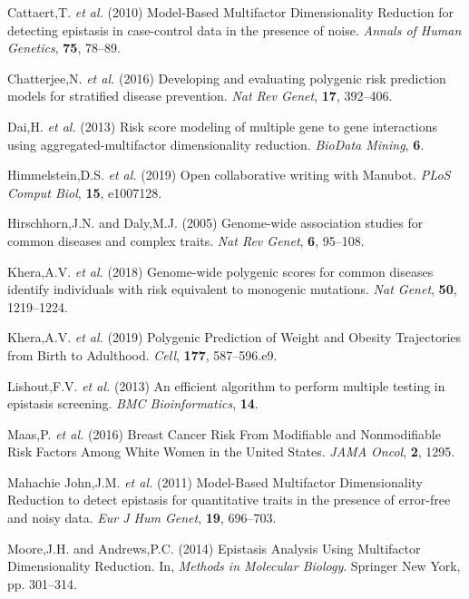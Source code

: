 \documentclass{ws-procs11x85}
\begin{document}
\leavevmode\hypertarget{ref-16AnEAMje}{}%
Cattaert,T. \emph{et al.} (2010) Model-Based Multifactor Dimensionality
Reduction for detecting epistasis in case-control data in the presence
of noise. \emph{Annals of Human Genetics}, \textbf{75}, 78--89.

\leavevmode\hypertarget{ref-auyRflEe}{}%
Chatterjee,N. \emph{et al.} (2016) Developing and evaluating polygenic
risk prediction models for stratified disease prevention. \emph{Nat Rev
Genet}, \textbf{17}, 392--406.

\leavevmode\hypertarget{ref-93PfLXPZ}{}%
Dai,H. \emph{et al.} (2013) Risk score modeling of multiple gene to gene
interactions using aggregated-multifactor dimensionality reduction.
\emph{BioData Mining}, \textbf{6}.

\leavevmode\hypertarget{ref-YuJbg3zO}{}%
Himmelstein,D.S. \emph{et al.} (2019) Open collaborative writing with
Manubot. \emph{PLoS Comput Biol}, \textbf{15}, e1007128.

\leavevmode\hypertarget{ref-5cdeEdUS}{}%
Hirschhorn,J.N. and Daly,M.J. (2005) Genome-wide association studies for
common diseases and complex traits. \emph{Nat Rev Genet}, \textbf{6},
95--108.

\leavevmode\hypertarget{ref-Gh0gKn77}{}%
Khera,A.V. \emph{et al.} (2018) Genome-wide polygenic scores for common
diseases identify individuals with risk equivalent to monogenic
mutations. \emph{Nat Genet}, \textbf{50}, 1219--1224.

\leavevmode\hypertarget{ref-oBD9eYkN}{}%
Khera,A.V. \emph{et al.} (2019) Polygenic Prediction of Weight and
Obesity Trajectories from Birth to Adulthood. \emph{Cell}, \textbf{177},
587--596.e9.

\leavevmode\hypertarget{ref-S6nj6BFK}{}%
Lishout,F.V. \emph{et al.} (2013) An efficient algorithm to perform
multiple testing in epistasis screening. \emph{BMC Bioinformatics},
\textbf{14}.

\leavevmode\hypertarget{ref-Z12fynub}{}%
Maas,P. \emph{et al.} (2016) Breast Cancer Risk From Modifiable and
Nonmodifiable Risk Factors Among White Women in the United States.
\emph{JAMA Oncol}, \textbf{2}, 1295.

\leavevmode\hypertarget{ref-kN4MaLuT}{}%
Mahachie John,J.M. \emph{et al.} (2011) Model-Based Multifactor
Dimensionality Reduction to detect epistasis for quantitative traits in
the presence of error-free and noisy data. \emph{Eur J Hum Genet},
\textbf{19}, 696--703.

\leavevmode\hypertarget{ref-1BqLrlGsj}{}%
Moore,J.H. and Andrews,P.C. (2014) Epistasis Analysis Using Multifactor
Dimensionality Reduction. In, \emph{Methods in Molecular Biology}.
Springer New York, pp. 301--314.
\end{document}
